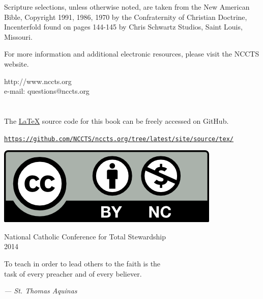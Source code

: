 \documentclass[oneside]{book}
\begin{document}
Scripture selections, unless otherwise noted, are taken from the New American
Bible, Copyright 1991, 1986, 1970 by the Confraternity of Christian Doctrine,
Incenterfold found on pages 144-145 by Chris Schwartz Studios, Saint Louis,
Missouri.

For more information and additional electronic resources, please visit the NCCTS
website.

\begin{center}

http://www.nccts.org \\
e-mail: questions@nccts.org

\section{} 

The \href{http://www.latex-project.org/}{\LaTeX} source code for this book can
be freely accessed on GitHub.

\texttt{\href{https://github.com/NCCTS/nccts.org/tree/latest/site/source/tex/}
             {https://github.com/NCCTS/nccts.org/tree/latest/site/source/tex/}}

\href{https://creativecommons.org/licenses/by-nc/3.0/}{
  \includegraphics[scale=0.6]{by-nc}
}

\end{center}

\vfill
\begin{center}

{\small National Catholic Conference for Total Stewardship \\ 2014}

\end{center}
\clearpage
\pagebreak


\vspace*{\fill}
\begin{center}

To teach in order to lead others to the faith is the \\ task of every preacher
and of every believer.

\emph{--- St. Thomas Aquinas}

\end{center}
\vspace*{\fill}
\pagebreak
\end{document}
